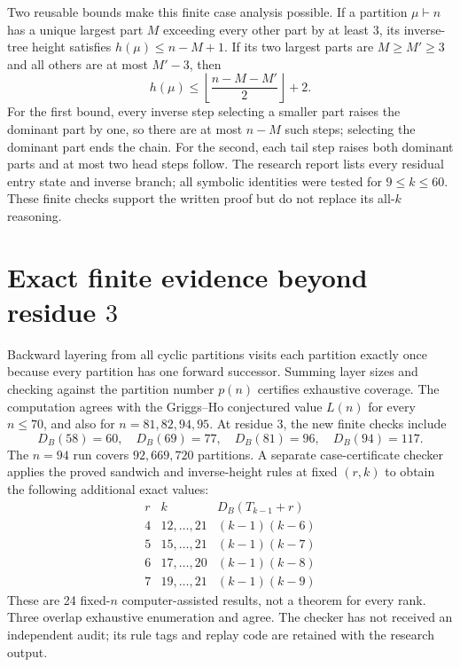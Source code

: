 \documentclass[11pt]{article}
\newcommand{\DB}{D_B}
\newcommand{\Tr}{T}
\begin{document}
Two reusable bounds make this finite case analysis possible.  If a partition
$\mu\vdash n$ has a unique largest part $M$ exceeding every other part by
at least $3$, its inverse-tree height satisfies $h(\mu)\leq n-M+1$.
If its two largest parts are $M\geq M'\geq3$ and all others are at most
$M'-3$, then
\[
 h(\mu)\leq\left\lfloor\frac{n-M-M'}2\right\rfloor+2.
\]
For the first bound, every inverse step selecting a smaller part raises the
dominant part by one, so there are at most $n-M$ such steps; selecting the
dominant part ends the chain.  For the second, each tail step raises both
dominant parts and at most two head steps follow.  The research report lists
every residual entry state and inverse branch; all symbolic identities were
tested for $9\leq k\leq60$.  These finite checks support the written proof
but do not replace its all-$k$ reasoning.

\section{Exact finite evidence beyond residue $3$}
Backward layering from all cyclic partitions visits each partition exactly
once because every partition has one forward successor.  Summing layer sizes
and checking against the partition number $p(n)$ certifies exhaustive
coverage.  The computation agrees with the Griggs--Ho conjectured value
$L(n)$ for every $n\leq70$, and also for $n=81,82,94,95$.
At residue $3$, the new finite checks include
\[
 \DB(58)=60,\quad \DB(69)=77,\quad
 \DB(81)=96,\quad \DB(94)=117.
\]
The $n=94$ run covers $92{,}669{,}720$ partitions.  A separate case-certificate
checker applies the proved sandwich and inverse-height rules at fixed
$(r,k)$ to obtain the following additional exact values:
\[
\begin{array}{c|c|c}
r& k&\DB(\Tr_{k-1}+r)\\ \hline
4&12,\ldots,21&(k-1)(k-6)\\
5&15,\ldots,21&(k-1)(k-7)\\
6&17,\ldots,20&(k-1)(k-8)\\
7&19,\ldots,21&(k-1)(k-9)
\end{array}
\]
These are 24 fixed-$n$ computer-assisted results, not a theorem for every
rank.  Three overlap exhaustive enumeration and agree.  The checker has not
received an independent audit; its rule tags and replay code are retained
with the research output.
\end{document}
